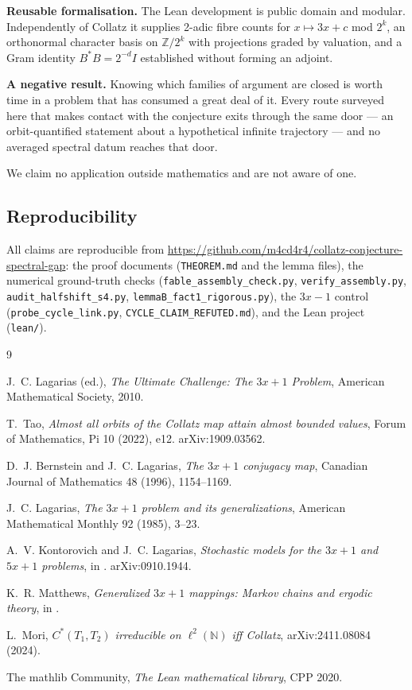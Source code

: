 \documentclass[12pt,a4paper]{article}
\newcommand{\N}{\mathbb{N}}
\newcommand{\Z}{\mathbb{Z}}
\begin{document}
\textbf{Reusable formalisation.} The Lean development is public domain and modular. Independently
of Collatz it supplies 2-adic fibre counts for $x \mapsto 3x + c$ mod $2^k$, an orthonormal
character basis on $\Z/2^k$ with projections graded by valuation, and a Gram identity
$B^\ast B = 2^{-d} I$ established without forming an adjoint.

\textbf{A negative result.} Knowing which families of argument are closed is worth time in a
problem that has consumed a great deal of it. Every route surveyed here that makes contact with
the conjecture exits through the same door --- an orbit-quantified statement about a hypothetical
infinite trajectory --- and no averaged spectral datum reaches that door.

We claim no application outside mathematics and are not aware of one.

\subsection*{Reproducibility}

All claims are reproducible from
\url{https://github.com/m4cd4r4/collatz-conjecture-spectral-gap}: the proof documents
(\texttt{THEOREM.md} and the lemma files), the numerical ground-truth checks
(\texttt{fable\_assembly\_check.py}, \texttt{verify\_assembly.py},
\texttt{audit\_halfshift\_s4.py}, \texttt{lemmaB\_fact1\_rigorous.py}), the $3x{-}1$ control
(\texttt{probe\_cycle\_link.py}, \texttt{CYCLE\_CLAIM\_REFUTED.md}), and the Lean project
(\texttt{lean/}).

\begin{thebibliography}{9}

J.~C. Lagarias (ed.), \emph{The Ultimate Challenge: The $3x+1$ Problem}, American Mathematical
Society, 2010.

T.~Tao, \emph{Almost all orbits of the Collatz map attain almost bounded values}, Forum of
Mathematics, Pi 10 (2022), e12. arXiv:1909.03562.

D.~J. Bernstein and J.~C. Lagarias, \emph{The $3x+1$ conjugacy map}, Canadian Journal of
Mathematics 48 (1996), 1154--1169.

J.~C. Lagarias, \emph{The $3x+1$ problem and its generalizations}, American Mathematical Monthly
92 (1985), 3--23.

A.~V. Kontorovich and J.~C. Lagarias, \emph{Stochastic models for the $3x+1$ and $5x+1$
problems}, in \cite{Lagarias2010}. arXiv:0910.1944.

K.~R. Matthews, \emph{Generalized $3x+1$ mappings: Markov chains and ergodic theory}, in
\cite{Lagarias2010}.

L.~Mori, \emph{$C^\ast(T_1, T_2)$ irreducible on $\ell^2(\N)$ iff Collatz}, arXiv:2411.08084
(2024).

The mathlib Community, \emph{The Lean mathematical library}, CPP 2020.

\end{thebibliography}
\end{document}
